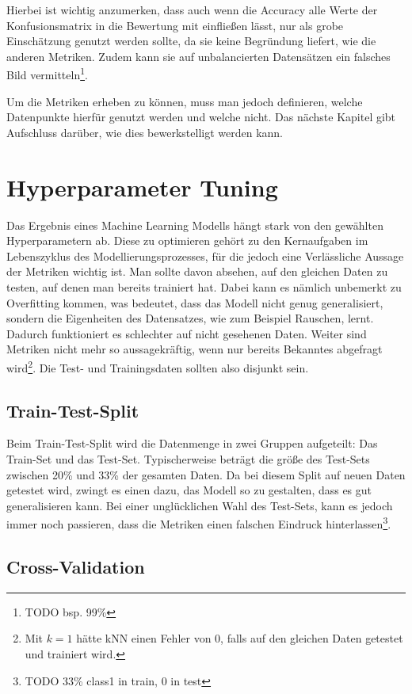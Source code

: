 Hierbei ist wichtig anzumerken, dass auch wenn die Accuracy alle Werte der Konfusionsmatrix in die Bewertung
 mit einfließen lässt, nur als grobe Einschätzung genutzt werden sollte, da sie keine Begründung liefert,
 wie die anderen Metriken. Zudem kann sie auf unbalancierten Datensätzen ein falsches Bild
 vermitteln\footnote{TODO bsp. 99\%}.

Um die Metriken erheben zu können, muss man jedoch definieren, welche Datenpunkte hierfür genutzt werden
 und welche nicht. Das nächste Kapitel gibt Aufschluss darüber, wie dies bewerkstelligt werden kann.


\section{Hyperparameter Tuning}

Das Ergebnis eines Machine Learning Modells hängt stark von den gewählten Hyperparametern ab. Diese zu
 optimieren gehört zu den Kernaufgaben im Lebenszyklus des Modellierungsprozesses, für die jedoch eine
 Verlässliche Aussage der Metriken wichtig ist. Man sollte davon absehen, auf den gleichen Daten zu testen,
 auf denen man bereits trainiert hat. Dabei kann es nämlich unbemerkt zu Overfitting kommen, was bedeutet,
 dass das Modell nicht genug generalisiert, sondern die Eigenheiten des Datensatzes, wie zum Beispiel Rauschen,
 lernt. Dadurch funktioniert es schlechter auf nicht gesehenen Daten. Weiter sind Metriken nicht mehr so
 aussagekräftig, wenn nur bereits Bekanntes abgefragt wird\footnote{Mit $k=1$ hätte kNN einen Fehler von $0$, falls
 auf den gleichen Daten getestet und trainiert wird.}. Die Test- und Trainingsdaten sollten also disjunkt sein.

\subsection*{Train-Test-Split}

Beim Train-Test-Split wird die Datenmenge in zwei Gruppen aufgeteilt: Das Train-Set und das Test-Set.
 Typischerweise beträgt die größe des Test-Sets zwischen 20\% und 33\% der gesamten Daten. Da bei diesem Split
 auf neuen Daten getestet wird, zwingt es einen dazu, das Modell so zu gestalten, dass es gut generalisieren
 kann. Bei einer unglücklichen Wahl des Test-Sets, kann es jedoch immer noch passieren, dass die Metriken
 einen falschen Eindruck hinterlassen\footnote{TODO 33\% class1 in train, 0 in test}.

\subsection*{Cross-Validation}

